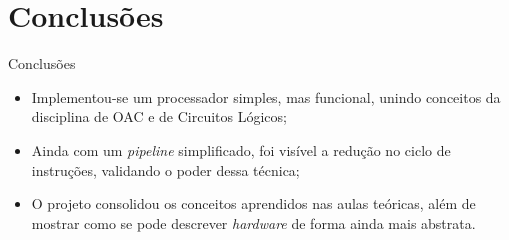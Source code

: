 \documentclass{beamer}
\begin{document}
	\section{Conclusões}
	\begin{frame}{Conclusões}
		\begin{itemize}
			\item<1-> Implementou-se um processador simples, mas
			funcional, unindo conceitos da disciplina de OAC e de Circuitos
			Lógicos;
		\item<2-> Ainda com um \emph{pipeline} simplificado, foi visível a 
			redução no ciclo de instruções, validando o poder dessa técnica;
		\item<3-> O projeto consolidou os conceitos
			aprendidos nas aulas teóricas, além de mostrar
			como se pode descrever \emph{hardware} de forma
			ainda mais abstrata.
		\end{itemize}
	\end{frame}
\end{document}
